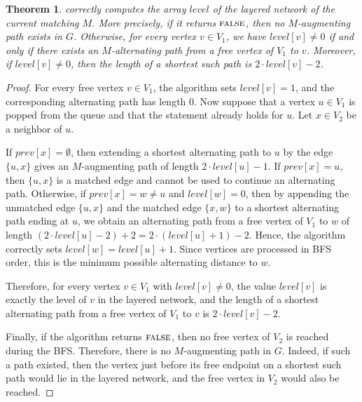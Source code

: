 \documentclass[12pt]{report}
\newtheorem{ttheorem}[base]{Theorem}
\numberwithin{algorithm}{chapter}
\newcommand{\False}{\textsc{false}}
\begin{document}
	\begin{ttheorem}
		 correctly computes the array $\mathit{level}$ of the layered network of the current matching $M$. More precisely, if it returns $\False$, then no $M$-augmenting path exists in $G$. Otherwise, for every vertex $v \in V_{1}$, we have $\mathit{level}[v] \neq 0$ if and only if there exists an $M$-alternating path from a free vertex of $V_{1}$ to $v$. Moreover, if $\mathit{level}[v] \neq 0$, then the length of a shortest such path is $2 \cdot \mathit{level}[v] - 2$.
	\end{ttheorem}
	\begin{proof}
		For every free vertex $v \in V_{1}$, the algorithm sets $\mathit{level}[v] = 1$, and the corresponding alternating path has length $0$. Now suppose that a vertex $u \in V_{1}$ is popped from the queue and that the statement already holds for $u$. Let $x \in V_{2}$ be a neighbor of $u$.
	
		If $\mathit{prev}[x] = \emptyset$, then extending a shortest alternating path to $u$ by the edge $\{u,x\}$ gives an $M$-augmenting path of length $2 \cdot \mathit{level}[u] - 1$. If $\mathit{prev}[x] = u$, then $\{u,x\}$ is a matched edge and cannot be used to continue an alternating path. Otherwise, if $\mathit{prev}[x] = w \neq u$ and $\mathit{level}[w] = 0$, then by appending the unmatched edge $\{u,x\}$ and the matched edge $\{x,w\}$ to a shortest alternating path ending at $u$, we obtain an alternating path from a free vertex of $V_{1}$ to $w$ of length
		$(2 \cdot \mathit{level}[u] - 2) + 2 = 2 \cdot (\mathit{level}[u] + 1) - 2$.
		Hence, the algorithm correctly sets $\mathit{level}[w] = \mathit{level}[u] + 1$. Since vertices are processed in BFS order, this is the minimum possible alternating distance to $w$.
	
		Therefore, for every vertex $v \in V_{1}$ with $\mathit{level}[v] \neq 0$, the value $\mathit{level}[v]$ is exactly the level of $v$ in the layered network, and the length of a shortest alternating path from a free vertex of $V_{1}$ to $v$ is $2 \cdot \mathit{level}[v] - 2$.
	
		Finally, if the algorithm returns $\False$, then no free vertex of $V_{2}$ is reached during the BFS. Therefore, there is no $M$-augmenting path in $G$. Indeed, if such a path existed, then the vertex just before its free endpoint on a shortest such path would lie in the layered network, and the free vertex in $V_{2}$ would also be reached.
	\end{proof}
	
\end{document}
